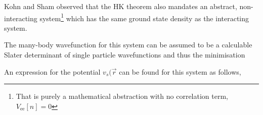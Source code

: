 
Kohn and Sham observed that the \ac{HK} theorem also mandates an abstract, non-interacting system\footnote{That is purely a mathematical abstraction with no correlation term, $V_{\textrm{ee}}[n] = 0$} which has the same ground state density as the interacting system.


The many-body wavefunction for this system can be assumed to be a calculable Slater determinant of single particle wavefunctions and thus the minimisation 


An expression for the potential $v_s(\vec{r}$ can be found for this system as follows,
